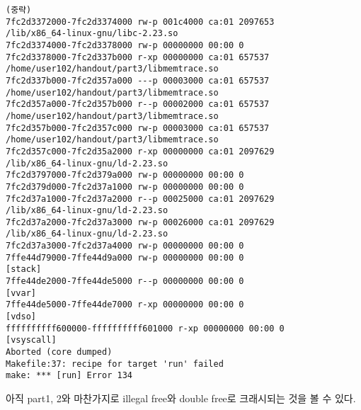 \documentclass{report}
\begin{document}
\begin{verbatim}
(중략)
7fc2d3372000-7fc2d3374000 rw-p 001c4000 ca:01 2097653                    /lib/x86_64-linux-gnu/libc-2.23.so
7fc2d3374000-7fc2d3378000 rw-p 00000000 00:00 0
7fc2d3378000-7fc2d337b000 r-xp 00000000 ca:01 657537                     /home/user102/handout/part3/libmemtrace.so
7fc2d337b000-7fc2d357a000 ---p 00003000 ca:01 657537                     /home/user102/handout/part3/libmemtrace.so
7fc2d357a000-7fc2d357b000 r--p 00002000 ca:01 657537                     /home/user102/handout/part3/libmemtrace.so
7fc2d357b000-7fc2d357c000 rw-p 00003000 ca:01 657537                     /home/user102/handout/part3/libmemtrace.so
7fc2d357c000-7fc2d35a2000 r-xp 00000000 ca:01 2097629                    /lib/x86_64-linux-gnu/ld-2.23.so
7fc2d3797000-7fc2d379a000 rw-p 00000000 00:00 0
7fc2d379d000-7fc2d37a1000 rw-p 00000000 00:00 0
7fc2d37a1000-7fc2d37a2000 r--p 00025000 ca:01 2097629                    /lib/x86_64-linux-gnu/ld-2.23.so
7fc2d37a2000-7fc2d37a3000 rw-p 00026000 ca:01 2097629                    /lib/x86_64-linux-gnu/ld-2.23.so
7fc2d37a3000-7fc2d37a4000 rw-p 00000000 00:00 0
7ffe44d79000-7ffe44d9a000 rw-p 00000000 00:00 0                          [stack]
7ffe44de2000-7ffe44de5000 r--p 00000000 00:00 0                          [vvar]
7ffe44de5000-7ffe44de7000 r-xp 00000000 00:00 0                          [vdso]
ffffffffff600000-ffffffffff601000 r-xp 00000000 00:00 0                  [vsyscall]
Aborted (core dumped)
Makefile:37: recipe for target 'run' failed
make: *** [run] Error 134
\end{verbatim}
아직 part1, 2와 마찬가지로 illegal free와 double free로  크래시되는 것을 볼 수 있다.
\end{document}
